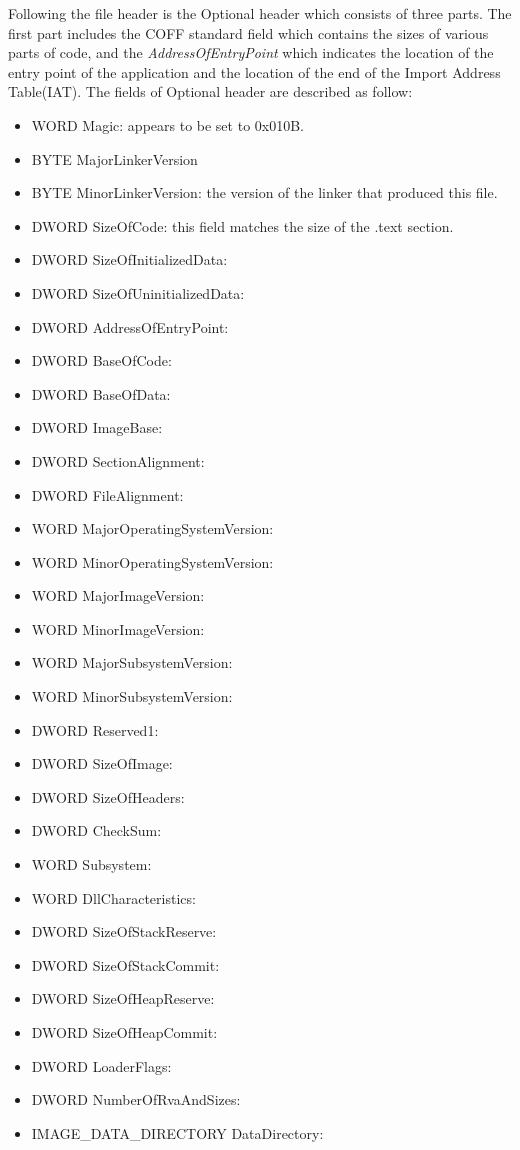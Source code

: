 Following the file header is the Optional header which consists of three parts. The first part includes the COFF standard field which contains the sizes of various parts of code, and the \emph{AddressOfEntryPoint} which indicates the location of the entry point of the application and the location of the end of the Import Address Table(IAT).
The fields of Optional header are described as follow: 
\begin{itemize}
\item WORD Magic: appears to be set to 0x010B.
\item BYTE MajorLinkerVersion
\item BYTE MinorLinkerVersion: the version of the linker that produced this file.
\item DWORD SizeOfCode: this field matches the size of the .text section.
\item DWORD SizeOfInitializedData: 
\item DWORD SizeOfUninitializedData: 
\item DWORD AddressOfEntryPoint: 
\item DWORD BaseOfCode: 
\item DWORD BaseOfData: 
\item DWORD ImageBase: 
\item DWORD SectionAlignment: 
\item DWORD FileAlignment: 
\item WORD MajorOperatingSystemVersion: 
\item WORD MinorOperatingSystemVersion: 
\item WORD MajorImageVersion: 
\item WORD MinorImageVersion: 
\item WORD MajorSubsystemVersion: 
\item WORD MinorSubsystemVersion: 
\item DWORD Reserved1: 
\item DWORD SizeOfImage: 
\item DWORD SizeOfHeaders: 
\item DWORD CheckSum: 
\item WORD Subsystem: 
\item WORD DllCharacteristics: 
\item DWORD SizeOfStackReserve:
\item DWORD SizeOfStackCommit: 
\item DWORD SizeOfHeapReserve:
\item DWORD SizeOfHeapCommit: 
\item DWORD LoaderFlags: 
\item DWORD NumberOfRvaAndSizes:
\item IMAGE\_DATA\_DIRECTORY DataDirectory:
\end{itemize}

